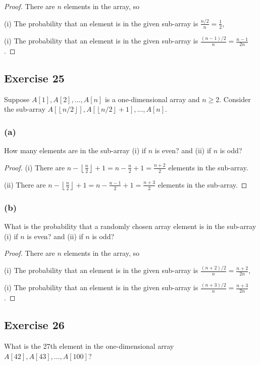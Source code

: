 \documentclass[14pt]{extarticle}
\newcommand{\floor}[1]{{\left\lfloor#1\right\rfloor}}
\begin{document}
\begin{proof}
There are $n$ elements in the array, so

(i) The probability that an element is in the given sub-array is \(\frac{n/2}{n} = \frac{1}{2}\),

(i) The probability that an element is in the given sub-array is \(\frac{(n-1)/2}{n} = \frac{n-1}{2n}\).
\end{proof}

\subsection{Exercise 25}
Suppose \(A[1], A[2], \ldots, A[n]\) is a one-dimensional array and \(n \geq 2\). Consider the sub-array 
\(A[\floor{n/2}], A[\floor{n/2}+1], \ldots, A[n]\).

\subsubsection{(a)}
How many elements are in the sub-array (i) if $n$ is even? and (ii) if $n$ is odd?

\begin{proof}
(i) There are \(n - \floor{\frac{n}{2}} + 1 = n - \frac{n}{2} + 1 = \frac{n+2}{2}\) elements in the sub-array.

(ii) There are \(n-\floor{\frac{n}{2}}+1 = n-\frac{n-1}{2} + 1 = \frac{n+3}{2}\) elements in the sub-array.
\end{proof}

\subsubsection{(b)}
What is the probability that a randomly chosen array element is in the sub-array (i) if $n$ is even? and 
(ii) if $n$ is odd?

\begin{proof}
There are $n$ elements in the array, so

(i) The probability that an element is in the given sub-array is \(\frac{(n+2)/2}{n} = \frac{n+2}{2n}\),

(i) The probability that an element is in the given sub-array is \(\frac{(n+3)/2}{n} = \frac{n+3}{2n}\).
\end{proof}

\subsection{Exercise 26}
What is the 27th element in the one-dimensional array \(A[42], A[43], \ldots, A[100]\)?
\end{document}
